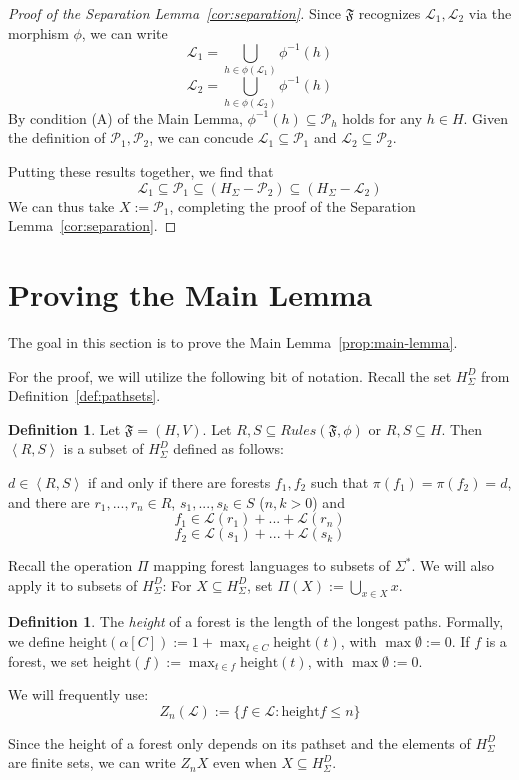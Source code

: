 \documentclass[sigplan,9pt]{acmart}\settopmatter{printfolios=true,printccs=false,printacmref=false}
\newcounter{thm}
\newcounter{theorem}
\theoremstyle{definition}
\newtheorem{defin}[thm]{Definition}
\newcommand{\La}[0]{{\mathcal{L}}}
\newcommand{\Ff}[0]{{\mathfrak{F}}}
\newcommand{\Pa}[0]{{\mathcal{P}}}
\newcommand{\height}[0]{\text{height}}
\newcommand{\freedisth}[0]{{H_\Sigma^D}}
\begin{document}
\begin{proof}[Proof of the Separation Lemma~\ref{cor:separation}]
Since $\Ff$ recognizes $\La_1, \La_2$ via the morphism $\phi$, we can write
$$\La_1 = \bigcup_{h \in \phi(\La_1)} \phi^{-1}(h)$$
$$\La_2 = \bigcup_{h \in \phi(\La_2)} \phi^{-1}(h)$$
By condition (A) of the Main Lemma, $\phi^{-1}(h) \subseteq \Pa_h$ holds for any $h \in H$.
Given the definition of $\Pa_1, \Pa_2$, we can concude $\La_1 \subseteq \Pa_1$ and $\La_2 \subseteq \Pa_2$.

Putting these results together, we find that \[\La_1 \subseteq \Pa_1 \subseteq \left(H_\Sigma - \Pa_2\right) \subseteq \left(H_\Sigma - \La_2\right)\]
We can thus take $X := \Pa_1$, completing the proof of the Separation Lemma~\ref{cor:separation}.
\end{proof}

\newpage
\section{Proving the Main Lemma}\label{sec:main-lemma}

The goal in this section is to prove the Main Lemma~\ref{prop:main-lemma}.



For the proof, we will utilize the following bit of notation.
Recall the set $\freedisth$ from Definition~\ref{def:pathsets}.
\begin{defin}
Let $\Ff = (H,V)$.
Let $R, S \subseteq Rules(\Ff,\phi)$ or $R, S \subseteq H$.
Then $\left\langle R, S\right\rangle$ is a subset of $\freedisth$ defined as follows:

$d \in \left\langle R, S\right\rangle$ if and only if there are forests $f_1, f_2$ such that $\pi(f_1) = \pi(f_2) = d$, and there are 
$r_1, ..., r_n \in R$, $s_1, ..., s_k \in S$ ($n, k > 0$) and
$$f_1 \in \La(r_1) + ... + \La(r_n)$$
$$f_2 \in \La(s_1) + ... + \La(s_k)$$
\end{defin}
Recall the operation $\Pi$ mapping forest languages to subsets of $\Sigma^*$.
We will also apply it to subsets of $\freedisth$: For $X \subseteq \freedisth$, set $\Pi(X) := \bigcup_{x \in X} x$.


\begin{defin}\label{def:height}
The \emph{height} of a forest is the length of the longest paths. Formally, we define $\height(\alpha[C]) := 1 + \max_{t \in C} \height(t)$, with $\max \emptyset := 0$.
If $f$ is a forest, we set $\height(f) := \max_{t \in f} \height(t)$, with $\max\emptyset := 0$.

We will frequently use:
$$Z_n(\La) := \{f \in \La: \height f \leq n\}$$%

Since the height of a forest only depends on its pathset and the elements of $\freedisth$ are finite sets, we can write $Z_n X$ even when $X \subseteq \freedisth$.

\end{defin}
\end{document}
